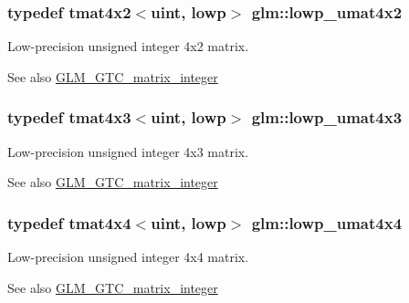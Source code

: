 \subsubsection[{lowp\+\_\+umat4x2}]{\setlength{\rightskip}{0pt plus 5cm}typedef tmat4x2$<${\bf uint}, lowp$>$ {\bf glm\+::lowp\+\_\+umat4x2}}\label{group__gtc__matrix__integer_ga5f4e6bb892b20b532bd9caa9aee120b9}
Low-\/precision unsigned integer 4x2 matrix. \begin{DoxySeeAlso}{See also}
\hyperlink{group__gtc__matrix__integer}{G\+L\+M\+\_\+\+G\+T\+C\+\_\+matrix\+\_\+integer} 
\end{DoxySeeAlso}
\hypertarget{group__gtc__matrix__integer_gae94cb13770f09d0a086e6fb627f47b84}{}
\subsubsection[{lowp\+\_\+umat4x3}]{\setlength{\rightskip}{0pt plus 5cm}typedef tmat4x3$<${\bf uint}, lowp$>$ {\bf glm\+::lowp\+\_\+umat4x3}}\label{group__gtc__matrix__integer_gae94cb13770f09d0a086e6fb627f47b84}
Low-\/precision unsigned integer 4x3 matrix. \begin{DoxySeeAlso}{See also}
\hyperlink{group__gtc__matrix__integer}{G\+L\+M\+\_\+\+G\+T\+C\+\_\+matrix\+\_\+integer} 
\end{DoxySeeAlso}
\hypertarget{group__gtc__matrix__integer_ga6ec13ea43b4328e29219f8515c188997}{}
\subsubsection[{lowp\+\_\+umat4x4}]{\setlength{\rightskip}{0pt plus 5cm}typedef tmat4x4$<${\bf uint}, lowp$>$ {\bf glm\+::lowp\+\_\+umat4x4}}\label{group__gtc__matrix__integer_ga6ec13ea43b4328e29219f8515c188997}
Low-\/precision unsigned integer 4x4 matrix. \begin{DoxySeeAlso}{See also}
\hyperlink{group__gtc__matrix__integer}{G\+L\+M\+\_\+\+G\+T\+C\+\_\+matrix\+\_\+integer} 
\end{DoxySeeAlso}
\hypertarget{group__gtc__matrix__integer_gae812330b83568359273b6ec96b002863}{}
